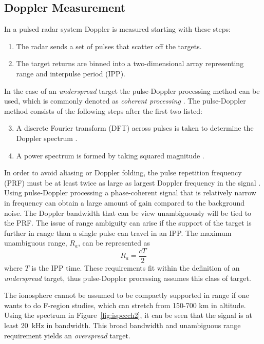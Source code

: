 \subsection{Doppler Measurement}
In a pulsed radar system Doppler is measured starting with these steps:
\begin{enumerate}
\label{list:uno}
\item The radar sends a set of pulses that scatter off the targets. 
\item The target returns are binned into a two-dimensional array representing range and interpulse period (IPP).
\end{enumerate}
In the case of an \textit{underspread} target the pulse-Doppler processing method can be used, which is commonly denoted as \textit{coherent processing} \citep{richards2014fundamentals,richards2010principles,richards2014principles,skolnik2008radar}. The pulse-Doppler method consists of the following steps after the first two listed:
\begin{enumerate}
  \setcounter{enumi}{2}
  \item A discrete Fourier transform (DFT) across pulses is taken to determine the Doppler spectrum \citep{richards2014fundamentals}. 
\item A power spectrum is formed by taking squared magnitude .  
\end{enumerate}

In order to avoid aliasing or Doppler folding, the pulse repetition frequency (PRF) must be at least twice as large as largest Doppler frequency in the signal \citep{dtsp:openhiem}. 
Using pulse-Doppler processing a phase-coherent signal that is relatively narrow in frequency can obtain a large amount of gain compared to the background noise. The Doppler bandwidth that can be view unambiguously will be tied to the PRF. The issue of range ambiguity can arise if the support of the target is further in range than a single pulse can travel in an IPP. The maximum unambiguous range, $R_a$, can be represented as 
\begin{equation}
\label{eqn:maxuar}
R_a =  \frac{cT}{2}
\end{equation}
where $T$ is the IPP time. These requirements fit within the definition of an  \textit{underspread} target, thus pulse-Doppler processing assumes this class of target.

The ionosphere cannot be assumed to be compactly supported in range if one wants to do F-region studies, which can stretch from 150-700 km in altitude. 
Using the spectrum in Figure~\ref{fig:ispecch2}, it can be seen that the signal is at least 20~kHz in bandwidth.
This broad bandwidth and unambiguous range requirement yields an \textit{overspread} target. 

